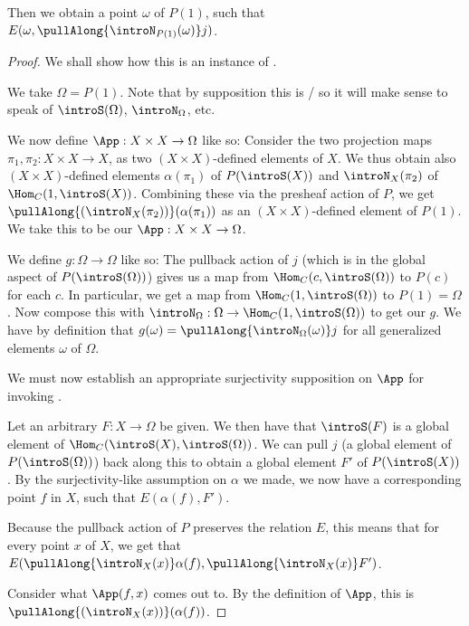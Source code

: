 Then we obtain a point $\omega$ of $P(1)$, such that $E(\omega, \pullAlong{\introN_{P(1)}(\omega)} j)$.
\begin{proof}
We shall show how this is an instance of .

We take $\Omega = P(1)$. Note that by supposition this is \repsmall/ so it will make sense to speak of $\introS(\Omega)$, $\introN_{\Omega}$, etc.

We now define $\App : X \times X \to \Omega$ like so: Consider the two projection maps $\pi_1, \pi_2 : X \times X \to X$, as two $(X \times X)$-defined elements of $X$. We thus obtain also $(X \times X)$-defined elements $\alpha(\pi_1)$ of $P(\introS(X))$ and $\introN_{X}(\pi_2)$ of $\Hom_C(1, \introS(X))$. Combining these via the presheaf action of $P$, we get $\pullAlong{( \introN_{X}(\pi_2) )} ( \alpha(\pi_1) )$ as an $(X \times X)$-defined element of $P(1)$. We take this to be our $\App : X \times X \to \Omega$.

We define $g : \Omega \to \Omega$ like so: The pullback action of $j$ (which is in the global aspect of $P(\introS(\Omega))$) gives us a map from $\Hom_C(c, \introS(\Omega))$ to $P(c)$ for each $c$. In particular, we get a map from $\Hom_C(1, \introS(\Omega))$ to $P(1) = \Omega$. Now compose this with $\introN_{\Omega} : \Omega \to \Hom_C(1, \introS(\Omega))$ to get our $g$. We have by definition that $g(\omega) = \pullAlong{\introN_{\Omega}(\omega)} j$ for all generalized elements $\omega$ of $\Omega$.

We must now establish an appropriate surjectivity supposition on $\App$ for invoking . 

Let an arbitrary $F : X \to \Omega$ be given. We then have that $\introS(F)$ is a global element of $\Hom_C(\introS(X), \introS(\Omega))$. We can pull $j$ (a global element of $P(\introS(\Omega))$) back along this to obtain a global element $F'$ of $P(\introS(X))$. By the surjectivity-like assumption on $\alpha$ we made, we now have a corresponding point $f$ in $X$, such that $E(\alpha(f), F')$.

Because the pullback action of $P$ preserves the relation $E$, this means that for every point $x$ of $X$, we get that $E(\pullAlong{\introN_{X}(x)} \alpha(f), \pullAlong{\introN_{X}(x)} F')$.

Consider what $\App(f, x)$ comes out to. By the definition of $\App$, this is $\pullAlong{( \introN_{X}(x) )} ( \alpha(f) )$.


\end{proof}
